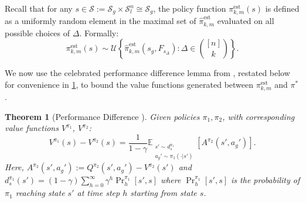 \documentclass{article}
\theoremstyle{plain}
\newtheorem{theorem}{Theorem}[section]
\theoremstyle{definition}
\def\est{\mathrm{est}}
\def\E{\mathbb{E}}
\begin{document}
   Recall that for any $s\in\mathcal{S}:=\mathcal{S}_g\times\mathcal{S}_l^n\cong \mathcal{S}_g$, the policy function ${\pi}^\est_{k,m}(s)$ is defined as a uniformly random element in the maximal set of $\hat{\pi}_{k,m}^\est$ evaluated on all possible choices of $\Delta$. Formally:
\begin{equation}
{\pi}_{k,m}^\est(s) \sim\mathcal{U} \left\{\hat{\pi}^\est_{k,m}(s_g,F_{s_\Delta}): \Delta\in \binom{[n]}{k}\right\}.
\end{equation}

We now use the celebrated performance difference lemma from \citet{Kakade+Langford:2002}, restated below for convenience in \cref{theorem: performance difference lemma}, to bound the value functions generated between ${\pi}_{k,m}^\est$ and $\pi^*$.\\
 
\begin{theorem}[Performance Difference  \cite{Kakade+Langford:2002}]\label{theorem: performance difference lemma}{Given policies $\pi_1, \pi_2$, with corresponding value functions $V^{\pi_1}$, $V^{\pi_2}$:}
\begin{equation}
    V^{\pi_1}(s) - V^{\pi_2}(s) = \frac{1}{1-\gamma} \E_{\substack{s'\sim d^{\pi_1}_s \\ a_g'\sim \pi_1(\cdot|s')} } [A^{\pi_2}(s',a_g')].
\end{equation}
\emph{Here, $A^{\pi_2}(s',a_g'):= Q^{\pi_2}(s',a_g') - V^{\pi_2}(s')$ and $d_s^{\pi_1}(s') = (1-\gamma) \sum_{h=0}^\infty \gamma^h \Pr_h^{\pi_1}[s',s]$ where $\Pr_h^{\pi_1}[s',s]$ is the probability of $\pi_1$ reaching state $s'$ at time step $h$ starting from state $s$.}\\
\end{theorem}
\end{document}
